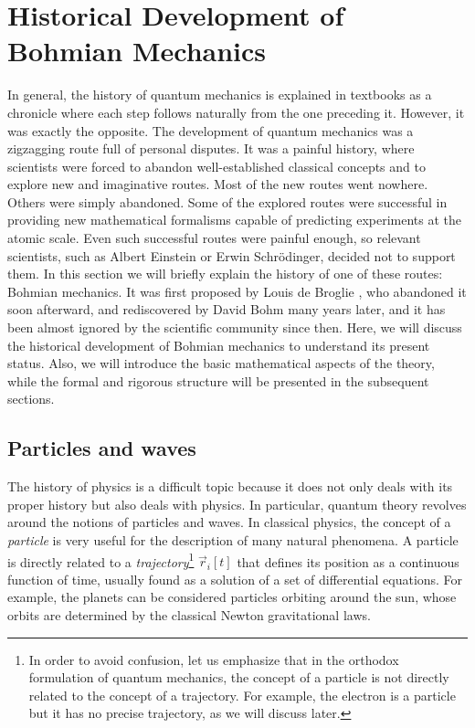 \documentclass[onecolumn,nofootinbib, secnumarabic, amsmath, nobibnotes,12pt,aps,pra]{revtex4-1}
\begin{document}
\section{Historical Development of Bohmian Mechanics}\label{om.sec_intro}

In general, the history of quantum mechanics is explained in
textbooks as a chronicle where each step follows naturally from the
one preceding it. However, it was exactly the opposite. The
development of quantum mechanics was a zigzagging route full of
personal disputes. It was a painful history, where scientists were
forced to abandon well-established classical concepts and to explore
new and imaginative routes. Most of the new routes went nowhere.
Others were simply abandoned. Some of the explored routes were
successful in providing new mathematical formalisms capable of
predicting experiments at the atomic scale. Even such successful
routes were painful enough, so relevant scientists, such as Albert
Einstein or Erwin Schr\"odinger, decided not to support them. In
this section we will briefly explain the history of one of these
routes: Bohmian mechanics. It was first proposed by Louis de Broglie
\cite{om.debroglie1923}, who abandoned it soon afterward, and
rediscovered by David Bohm \cite{om.bohm1952a,om.bohm1952b} many years
later, and it has been almost ignored by the scientific community
since then. Here, we will discuss the historical development of
Bohmian mechanics to understand its present status. Also, we will
introduce the basic mathematical aspects of the theory, while the
formal and rigorous structure will be presented in the subsequent 
sections.

\subsection{Particles and waves}\label{om.sec_intro.1}

The history of physics is a difficult topic because it does not only
deals with its proper history but also deals with physics. In particular,
quantum theory revolves around the notions of particles and waves.
In classical physics, the concept of a \textit{particle} is very
useful for the description of many natural phenomena. A particle is
directly related to a \textit{trajectory}\footnote{In order to avoid
confusion, let us emphasize that in the orthodox formulation of
quantum mechanics, the concept of a particle is not directly related
to the concept of a trajectory. For example, the electron is a
particle but it has no precise trajectory, as we will discuss
later.} $\vec{r}_{i}[t]$ that defines its position as a continuous
function of time, usually found as a solution of a set of
differential equations. For example, the planets can be considered
particles orbiting around the sun, whose orbits are determined by
the classical Newton gravitational laws.
\end{document}
